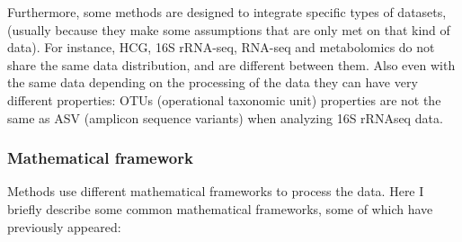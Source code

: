 \documentclass[
  a4paper,
]{book}
\begin{document}
Furthermore, some methods are designed to integrate specific types of datasets, (usually because they make some assumptions that are only met on that kind of data).
For instance, HCG, 16S rRNA-seq, RNA-seq and metabolomics do not share the same data distribution, and are different between them.
Also even with the same data depending on the processing of the data they can have very different properties: OTUs (operational taxonomic unit) properties are not the same as ASV (amplicon sequence variants) when analyzing 16S rRNAseq data.

\hypertarget{mathematical-framework}{%
\subsubsection{Mathematical framework}\label{mathematical-framework}}

Methods use different mathematical frameworks to process the data.
Here I briefly describe some common mathematical frameworks, some of which have previously appeared:
\end{document}
